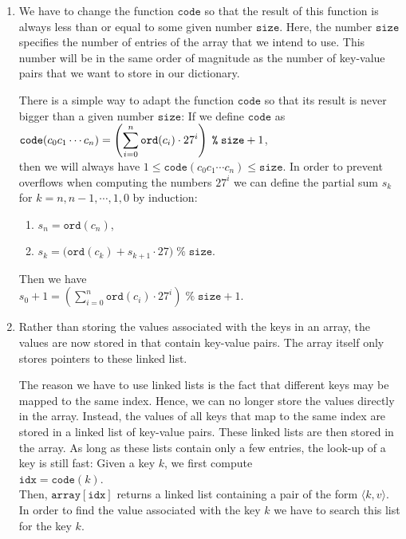 \begin{enumerate}
\item We have to change the function  $\texttt{code}$ so that the result of this function is always
      less than or equal to some given number $\texttt{size}$.  Here, the number $\texttt{size}$ specifies
      the number of entries of the array that we intend to use.  This number will be in the same
      order of magnitude as the number of key-value pairs that we want to store in our dictionary.

      There is a simple way to adapt the function  $\texttt{code}$ so that its result is never bigger
      than a given number $\texttt{size}$: If we define $\texttt{code}$ as
      \\[0.2cm]
      \hspace*{1.3cm} 
      $\displaystyle\texttt{code}(c_0c_1\cdots c_n) = \left(\sum\limits_{i=0}^n \texttt{ord}(c_i) \cdot
        27^i\right) \;\texttt{\%}\; \texttt{size} + 1$,
      \\[0.2cm]
      then we will always have $1 \leq \texttt{code}(c_0c_1\cdots c_n) \leq \texttt{size}$.  In order to
      prevent overflows when computing the numbers $27^i$ we can define the partial sum $s_k$ for
      $k=n,n-1,\cdots,1,0$ by induction: 
      \begin{enumerate}
      \item $s_n = \texttt{ord}(c_n)$,
      \item $s_{k} = \bigl(\texttt{ord}(c_{k}) + s_{k+1} \cdot 27 \bigr) \;\texttt{\%}\; \texttt{size}$.
      \end{enumerate}
      Then we have
      \\[0.2cm]
      \hspace*{1.3cm} 
      $s_0 + 1 = \left(\sum\limits_{i=0}^n \texttt{ord}(c_i) \cdot 27^i\right) \;\texttt{\%}\; \texttt{size} + 1$.
\item Rather than storing the values associated with the keys in an array, the values are now stored
      in  that contain key-value pairs.  The array itself only stores pointers to these
      linked list. 
      
      The reason we have to use linked lists is the fact that different keys may be mapped to the
      same index.  Hence, we can no longer store the values directly in the array.  Instead,
      the values of all keys that map to the same index are stored in a
      linked list of key-value pairs.  These linked lists are then stored in the array.  As long as
      these lists contain only a few entries, the look-up of a key is still fast: Given a key $k$,
      we first compute 
      \\[0.2cm]
      \hspace*{1.3cm}
      $\texttt{idx} = \texttt{code}(k)$.
      \\[0.2cm]
      Then, $\texttt{array}[\texttt{idx}]$ returns a linked list containing a pair of the form $\langle k, v \rangle$.
      In order to find the value associated with the key $k$ we have to search this list for the key
      $k$.
\end{enumerate}
